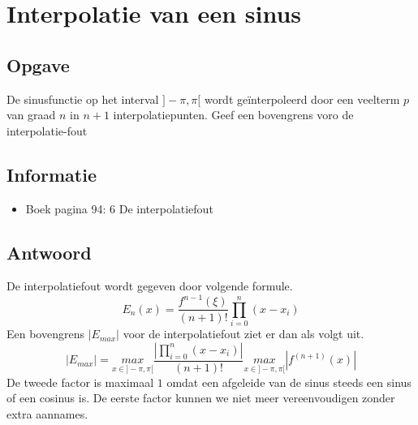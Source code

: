 \documentclass[examenvragen.tex]{subfiles}
\begin{document}
\section{Interpolatie van een sinus}
\subsection{Opgave}
De sinusfunctie op het interval $]-\pi,\pi[$ wordt ge\"interpoleerd door een veelterm $p$ van graad $n$ in $n+1$ interpolatiepunten.
Geef een bovengrens voro de interpolatie-fout

\subsection{Informatie}
\begin{itemize}
\item Boek pagina 94: 6 De interpolatiefout
\end{itemize}

\subsection{Antwoord}
De interpolatiefout wordt gegeven door volgende formule.
\[
E_{n}(x) = \frac{f^{n-1}(\xi)}{(n+1)!}\prod_{i=0}^{n}(x-x_i)
\]
Een bovengrens $|E_{max}|$ voor de interpolatiefout ziet er dan als volgt uit.
\[
|E_{max}| = \underset{x\in]-\pi,\pi[}{max}\frac{\left|\prod_{i=0}^{n}(x-x_i)\right|}{(n+1)!}\underset{x\in]-\pi,\pi[}{max}|f^{(n+1)}(x)|
\]
De tweede factor is maximaal $1$ omdat een afgeleide van de sinus steeds een sinus of een cosinus is.
De eerste factor kunnen we niet meer vereenvoudigen zonder extra aannames.
\end{document}
